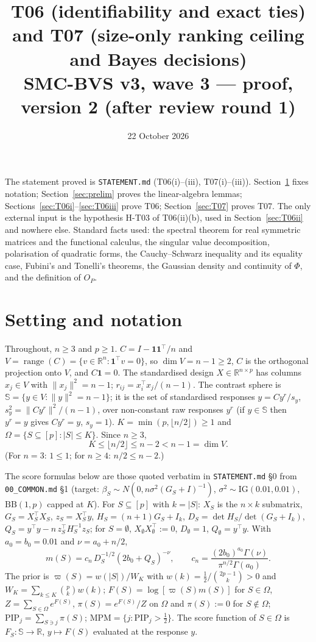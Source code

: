 \documentclass[11pt]{article}
\title{T06 (identifiability and exact ties) and T07 (size-only ranking ceiling and Bayes decisions)\\[2pt]\large SMC-BVS v3, wave 3 --- proof, version 2 (after review round 1)}
\date{22 October 2026}
\author{}
\theoremstyle{remark}
\newcommand{\R}{\mathbb R}
\newcommand{\Sph}{\mathbb S}
\newcommand{\one}{\mathbf 1}
\newcommand{\PIP}{\mathrm{PIP}}
\newcommand{\MPM}{\mathrm{MPM}}
\begin{document}
\maketitle

\noindent The statement proved is \texttt{STATEMENT.md} (T06(i)--(iii), T07(i)--(iii)). Section~\ref{sec:setting} fixes notation; Section~\ref{sec:prelim} proves the linear-algebra lemmas; Sections~\ref{sec:T06i}--\ref{sec:T06iii} prove T06; Section~\ref{sec:T07} proves T07. The only external input is the hypothesis H-T03 of T06(ii)(b), used in Section~\ref{sec:T06ii} and nowhere else. Standard facts used: the spectral theorem for real symmetric matrices and the functional calculus, the singular value decomposition, polarisation of quadratic forms, the Cauchy--Schwarz inequality and its equality case, Fubini's and Tonelli's theorems, the Gaussian density and continuity of $\Phi$, and the definition of $O_{P}$.

\section{Setting and notation}\label{sec:setting}

Throughout, $n\ge3$ and $p\ge1$. $C=I-\one\one^\top/n$ and $V=\operatorname{range}(C)=\{v\in\R^n:\one^\top v=0\}$, so $\dim V=n-1\ge2$, $C$ is the orthogonal projection onto $V$, and $C\one=0$. The standardised design $X\in\R^{n\times p}$ has columns $x_j\in V$ with $\|x_j\|^2=n-1$; $r_{ij}=x_i^\top x_j/(n-1)$. The contrast sphere is $\Sph=\{y\in V:\|y\|^2=n-1\}$; it is the set of standardised responses $y=Cy^r/s_y$, $s_y^2=\|Cy^r\|^2/(n-1)$, over non-constant raw responses $y^r$ (if $y\in\Sph$ then $y^r=y$ gives $Cy^r=y$, $s_y=1$). $K=\min(p,\lfloor n/2\rfloor)\ge1$ and $\Omega=\{S\subseteq[p]:|S|\le K\}$. Since $n\ge3$,
\begin{equation}\label{eq:Kbound}
K\le\lfloor n/2\rfloor\le n-2<n-1=\dim V .
\end{equation}
(For $n=3$: $1\le1$; for $n\ge4$: $n/2\le n-2$.)

The score formulas below are those quoted verbatim in \texttt{STATEMENT.md} \S0 from \texttt{00\_COMMON.md} \S1 (target: $\beta_S\sim N(0,n\sigma^2(G_S+I)^{-1})$, $\sigma^2\sim\mathrm{IG}(0.01,0.01)$, $\mathrm{BB}(1,p)$ capped at $K$). For $S\subseteq[p]$ with $k=|S|$: $X_S$ is the $n\times k$ submatrix, $G_S=X_S^\top X_S$, $z_S=X_S^\top y$, $H_S=(n+1)G_S+I_k$, $D_S=\det H_S/\det(G_S+I_k)$, $Q_S=y^\top y-n\,z_S^\top H_S^{-1}z_S$; for $S=\emptyset$, $X_\emptyset X_\emptyset^\top:=0$, $D_\emptyset=1$, $Q_\emptyset=y^\top y$. With $a_0=b_0=0.01$ and $\nu=a_0+n/2$,
\[
m(S)=c_n\,D_S^{-1/2}(2b_0+Q_S)^{-\nu},\qquad c_n=\frac{(2b_0)^{a_0}\Gamma(\nu)}{\pi^{n/2}\Gamma(a_0)} .
\]
The prior is $\varpi(S)=w(|S|)/W_K$ with $w(k)=\tfrac12/\binom{2p-1}{k}>0$ and $W_K=\sum_{k\le K}\binom pk w(k)$; $F(S)=\log[\varpi(S)m(S)]$ for $S\in\Omega$, $Z=\sum_{S\in\Omega}e^{F(S)}$, $\pi(S)=e^{F(S)}/Z$ on $\Omega$ and $\pi(S):=0$ for $S\notin\Omega$; $\PIP_j=\sum_{S\ni j}\pi(S)$; $\MPM=\{j:\PIP_j>\tfrac12\}$. The score function of $S\in\Omega$ is $F_S:\Sph\to\R$, $y\mapsto F(S)$ evaluated at the response $y$.
\end{document}
